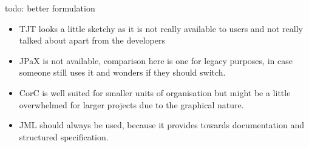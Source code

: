 todo: better formulation
\begin{itemize}
	\item TJT looks a little sketchy as it is not really available to users and not really talked about apart from the developers
	\item JPaX is not available, comparison here is one for legacy purposes, in case someone still uses it and wonders if they should switch. 
	\item CorC is well suited for smaller units of organisation but might be a little overwhelmed for larger projects due to the graphical nature. 
	\item JML should always be used, because it provides towards documentation and structured specification. 
\end{itemize}